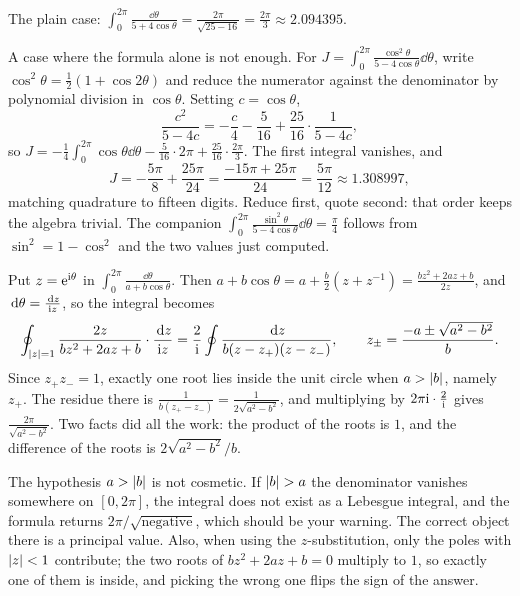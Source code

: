 \begin{worked}
The plain case: $\displaystyle\int_0^{2\pi}\frac{\dd\theta}{5+4\cos\theta}=\frac{2\pi}{\sqrt{25-16}}=\frac{2\pi}{3}\approx2.094395$.

A case where the formula alone is not enough. For $\displaystyle J=\int_0^{2\pi}\frac{\cos^{2}\theta}{5-4\cos\theta}\dd\theta$, write $\cos^{2}\theta=\tfrac12(1+\cos2\theta)$ and reduce the numerator against the denominator by polynomial division in $\cos\theta$. Setting $c=\cos\theta$,
\[\frac{c^{2}}{5-4c}=-\frac{c}{4}-\frac{5}{16}+\frac{25}{16}\cdot\frac{1}{5-4c},\]
so $J=-\tfrac14\int_0^{2\pi}\cos\theta\dd\theta-\tfrac{5}{16}\cdot2\pi+\tfrac{25}{16}\cdot\tfrac{2\pi}{3}$. The first integral vanishes, and
\[J=-\frac{5\pi}{8}+\frac{25\pi}{24}=\frac{-15\pi+25\pi}{24}=\frac{5\pi}{12}\approx1.308997,\]
matching quadrature to fifteen digits. Reduce first, quote second: that order keeps the algebra trivial. The companion $\int_0^{2\pi}\frac{\sin^{2}\theta}{5-4\cos\theta}\dd\theta=\frac{\pi}{4}$ follows from $\sin^{2}=1-\cos^{2}$ and the two values just computed.
\end{worked}

\begin{worked}
Put $z=\mathrm{e}^{\mathrm{i}\theta}$ in $\int_0^{2\pi}\frac{\dd\theta}{a+b\cos\theta}$. Then $a+b\cos\theta=a+\tfrac b2(z+z^{-1})=\tfrac{bz^{2}+2az+b}{2z}$, and $\,\mathrm{d}\theta=\tfrac{\,\mathrm{d} z}{\mathrm{i} z}$, so the integral becomes
\[\oint_{\left\lvert z\right\rvert=1}\frac{2z}{bz^{2}+2az+b}\cdot\frac{\,\mathrm{d} z}{\mathrm{i} z}=\frac{2}{\mathrm{i}}\oint\frac{\,\mathrm{d} z}{b(z-z_{+})(z-z_{-})},\qquad z_{\pm}=\frac{-a\pm\sqrt{a^{2}-b^{2}}}{b}.\]
Since $z_{+}z_{-}=1$, exactly one root lies inside the unit circle when $a>\left\lvert b\right\rvert$, namely $z_{+}$. The residue there is $\tfrac{1}{b(z_{+}-z_{-})}=\tfrac{1}{2\sqrt{a^{2}-b^{2}}}$, and multiplying by $2\pi\mathrm{i}\cdot\tfrac{2}{\mathrm{i}}$ gives $\tfrac{2\pi}{\sqrt{a^{2}-b^{2}}}$. Two facts did all the work: the product of the roots is $1$, and the difference of the roots is $2\sqrt{a^{2}-b^{2}}/b$.
\end{worked}

\begin{trap}
The hypothesis $a>\left\lvert b\right\rvert$ is not cosmetic. If $\left\lvert b\right\rvert>a$ the denominator vanishes somewhere on $[0,2\pi]$, the integral does not exist as a Lebesgue integral, and the formula returns $2\pi/\sqrt{\text{negative}}$, which should be your warning. The correct object there is a principal value. Also, when using the $z$-substitution, only the poles with $\left\lvert z\right\rvert<1$ contribute; the two roots of $bz^{2}+2az+b=0$ multiply to $1$, so exactly one of them is inside, and picking the wrong one flips the sign of the answer.
\end{trap}

